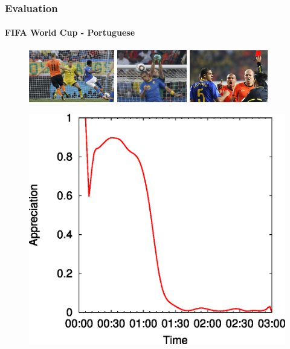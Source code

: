 \documentclass[14pt]{beamer}
\begin{document}
\begin{frame}\frametitle{Evaluation}
\framesubtitle{FIFA World Cup - Portuguese}
\vspace{-0.1in}
\begin{figure}
\centering
\includegraphics[height=0.9in]{golrobinho.eps}
\includegraphics[height=0.90in]{contra.eps}
\includegraphics[height=0.90in]{vermelho.eps}
\end{figure}

\vspace{-0.15in}
\begin{figure}
\centering
\includegraphics[scale=0.41]{felipemeloPositividade.eps}
\end{figure}

\end{frame}
\end{document}
